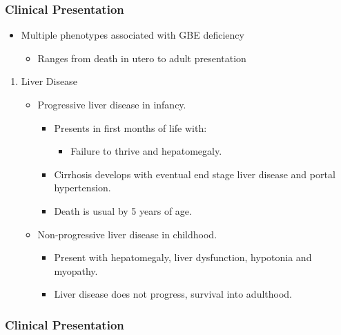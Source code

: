 \documentclass{scrartcl}
\begin{document}
\subsubsection{Clinical Presentation}
\label{sec:orgda5b739}

\begin{itemize}
\item Multiple phenotypes associated with GBE deficiency
\begin{itemize}
\item Ranges from death in utero to adult presentation
\end{itemize}
\end{itemize}

\begin{enumerate}
\item Liver Disease
\label{sec:org33bbd55}
\begin{itemize}
\item Progressive liver disease in infancy.
\begin{itemize}
\item Presents in first months of life with:
\begin{itemize}
\item Failure to thrive and hepatomegaly.
\end{itemize}
\item Cirrhosis develops with eventual end stage liver disease and
portal hypertension.
\item Death is usual by 5 years of age.
\end{itemize}
\item Non-progressive liver disease in childhood.
\begin{itemize}
\item Present with hepatomegaly, liver dysfunction, hypotonia and
myopathy.
\item Liver disease does not progress, survival into adulthood.
\end{itemize}
\end{itemize}
\end{enumerate}

\subsubsection{Clinical Presentation}
\label{sec:org0b37548}
\end{document}
